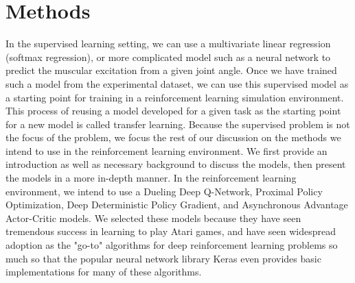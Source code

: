 \documentclass[journal,onecolumn]{IEEEtran}
\begin{document}
\section{Methods}
In the supervised learning setting, we can use a multivariate linear regression (softmax regression), or more complicated model such as a neural network to predict the muscular excitation from a given joint angle. Once we have trained such a model from the experimental dataset, we can use this supervised model as a starting point for training in a reinforcement learning simulation environment. This process of reusing a model developed for a given task as the starting point for a new model is called transfer learning. Because the supervised problem is not the focus of the problem, we focus the rest of our discussion on the methods we intend to use in the reinforcement learning environment. We first provide an introduction as well as necessary background to discuss the models, then present the models in a more in-depth manner. In the reinforcement learning environment, we intend to use a Dueling Deep Q-Network, Proximal Policy Optimization, Deep Deterministic Policy Gradient, and Asynchronous Advantage Actor-Critic models. We selected these models because they have seen tremendous success in learning to play Atari games, and have seen widespread adoption as the "go-to" algorithms for deep reinforcement learning problems so much so that the popular neural network library Keras even provides basic implementations for many of these algorithms.  
\end{document}
